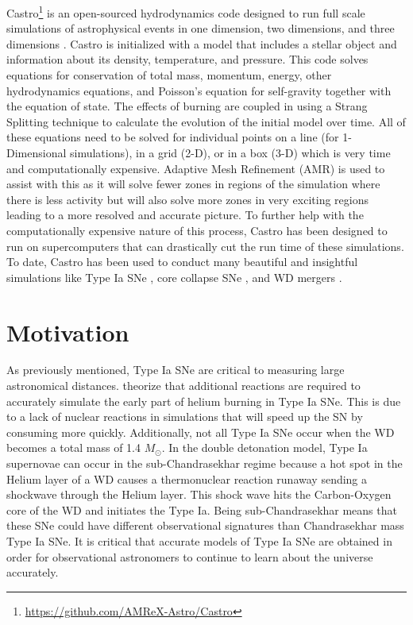 \documentclass[preprint]{aastex62}
\begin{document}
    Castro\footnote{\url{https://github.com/AMReX-Astro/Castro}} is an open-sourced hydrodynamics code designed to run full scale simulations of astrophysical events in one dimension, two dimensions, and three dimensions \citep{castro}. Castro is initialized with a model that includes a stellar object and information about its density, temperature, and pressure. This code solves equations for conservation of total mass, momentum, energy, other hydrodynamics equations, and Poisson's equation for self-gravity together with the equation of state. The effects of burning are coupled in using a Strang Splitting technique \citep{strang} to calculate the evolution of the initial model over time. All of these equations need to be solved for individual points on a line (for 1-Dimensional simulations), in a grid (2-D), or in a box (3-D) which is very time and computationally expensive. Adaptive Mesh Refinement (AMR) is used to assist with this as it will solve fewer zones in regions of the simulation where there is less activity but will also solve more zones in very exciting regions leading to a more resolved and accurate picture. To further help with the computationally expensive nature of this process, Castro has been designed to run on supercomputers that can drastically cut the run time of these simulations. To date, Castro has been used to conduct many beautiful and insightful simulations like Type Ia SNe \citep{subch1, subch2}, core collapse SNe \citep{corecollapse1, corecollapse2}, and WD mergers \citep{merger}. 
  
\section{Motivation}
  
  As previously mentioned, Type Ia SNe are critical to measuring large astronomical distances. \citet{shenNbildsten} theorize that additional reactions are required to accurately simulate the early part of helium burning in Type Ia SNe. This is due to a lack of nuclear reactions in simulations that will speed up the SN by consuming  more quickly. Additionally, not all Type Ia SNe occur when the WD becomes a total mass of 1.4 $M_{\odot}$. In the double detonation model, Type Ia supernovae can occur in the sub-Chandrasekhar regime because a hot spot in the Helium layer of a WD causes a thermonuclear reaction runaway sending a shockwave through the Helium layer. This shock wave hits the Carbon-Oxygen core of the WD and initiates the Type Ia. Being sub-Chandrasekhar means that these SNe could have different observational signatures than Chandrasekhar mass Type Ia SNe. It is critical that accurate models of Type Ia SNe are obtained in order for observational astronomers to continue to learn about the universe accurately. 
  
\end{document}
